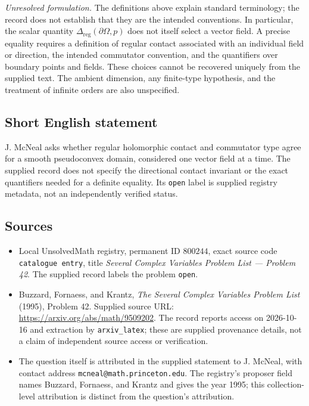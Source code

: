 \documentclass[11pt]{article}
\begin{document}
\textit{Unresolved formulation.} The definitions above explain standard terminology; the record does not establish that they are the intended conventions. In particular, the scalar quantity \(\Delta_{\mathrm{reg}}(\partial\Omega,p)\) does not itself select a vector field. A precise equality requires a definition of regular contact associated with an individual field or direction, the intended commutator convention, and the quantifiers over boundary points and fields. These choices cannot be recovered uniquely from the supplied text. The ambient dimension, any finite-type hypothesis, and the treatment of infinite orders are also unspecified.
\subsection{Short English statement}
J. McNeal asks whether regular holomorphic contact and commutator type agree for a smooth pseudoconvex domain, considered one vector field at a time. The supplied record does not specify the directional contact invariant or the exact quantifiers needed for a definite equality. Its \texttt{open} label is supplied registry metadata, not an independently verified status.
\subsection{Sources}
\begin{itemize}
\item Local UnsolvedMath registry, permanent ID \(800244\), exact source code \texttt{catalogue entry}, title \emph{Several Complex Variables Problem List --- Problem 42}. The supplied record labels the problem \texttt{open}.
\item Buzzard, Fornaess, and Krantz, \emph{The Several Complex Variables Problem List} (1995), Problem 42. Supplied source URL: \url{https://arxiv.org/abs/math/9509202}. The record reports access on 2026-10-16 and extraction by \texttt{arxiv\_latex}; these are supplied provenance details, not a claim of independent source access or verification.
\item The question itself is attributed in the supplied statement to J. McNeal, with contact address \texttt{mcneal@math.princeton.edu}. The registry's proposer field names Buzzard, Fornaess, and Krantz and gives the year 1995; this collection-level attribution is distinct from the question's attribution.
\end{itemize}
\end{document}

